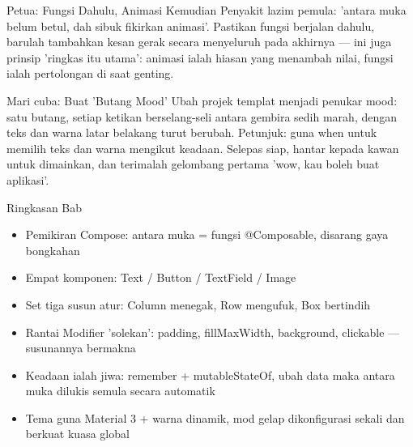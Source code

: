\begin{tcbinfo}{Petua: Fungsi Dahulu, Animasi Kemudian}
Penyakit lazim pemula: 'antara muka belum betul, dah sibuk fikirkan animasi'. Pastikan fungsi berjalan dahulu, barulah tambahkan kesan gerak secara menyeluruh pada akhirnya — ini juga prinsip 'ringkas itu utama': animasi ialah hiasan yang menambah nilai, fungsi ialah pertolongan di saat genting.

\end{tcbinfo}

\begin{tcbpractice}{Mari cuba: Buat 'Butang Mood'}
Ubah projek templat menjadi penukar mood: satu butang, setiap ketikan berselang-seli antara gembira sedih marah, dengan teks dan warna latar belakang turut berubah. Petunjuk: guna when untuk memilih teks dan warna mengikut keadaan. Selepas siap, hantar kepada kawan untuk dimainkan, dan terimalah gelombang pertama 'wow, kau boleh buat aplikasi'.

\end{tcbpractice}

\begin{tcbsummary}{Ringkasan Bab}
\begin{itemize}
  \item Pemikiran Compose: antara muka = fungsi @Composable, disarang gaya bongkahan
  \item Empat komponen: Text / Button / TextField / Image
  \item Set tiga susun atur: Column menegak, Row mengufuk, Box bertindih
  \item Rantai Modifier 'solekan': padding, fillMaxWidth, background, clickable — susunannya bermakna
  \item Keadaan ialah jiwa: remember + mutableStateOf, ubah data maka antara muka dilukis semula secara automatik
  \item Tema guna Material 3 + warna dinamik, mod gelap dikonfigurasi sekali dan berkuat kuasa global
\end{itemize}

\end{tcbsummary}
